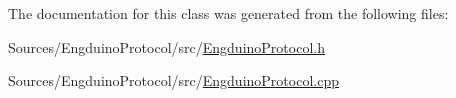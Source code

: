 The documentation for this class was generated from the following files\+:\begin{DoxyCompactItemize}
\item 
Sources/\+Engduino\+Protocol/src/\hyperlink{_engduino_protocol_8h}{Engduino\+Protocol.\+h}\item 
Sources/\+Engduino\+Protocol/src/\hyperlink{_engduino_protocol_8cpp}{Engduino\+Protocol.\+cpp}\end{DoxyCompactItemize}
